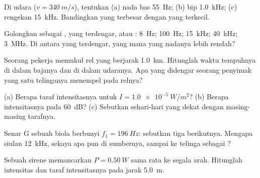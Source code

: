 \begin{exercise}[$\star$]\label{exo:g12:sound-acoustics:1}
Di udara ($v = \qty{340}{m/s}$), tentukan  (a) nada bas
\qty{55}{Hz}; (b)  bip \qty{1.0}{kHz}; (c) rengekan \qty{15}{kHz}.
Bandingkan yang terbesar dengan yang terkecil.
\end{exercise}

\begin{exercise}[$\star$]\label{exo:g12:sound-acoustics:2}
Golongkan sebagai ,  yang terdengar, atau :
\qty{8}{Hz}; \qty{100}{Hz}; \qty{15}{kHz}; \qty{40}{kHz}; \qty{3}{MHz}.
Di antara yang terdengar, yang mana yang nadanya lebih rendah?
\end{exercise}

\begin{exercise}[$\star$]\label{exo:g12:sound-acoustics:3}
Seorang pekerja memukul rel yang berjarak \qty{1.0}{km}. Hitunglah waktu
tempuhnya di dalam bajanya dan di dalam udaranya. Apa yang didengar
seorang penyimak yang satu telinganya menempel pada relnya?
\end{exercise}

\begin{exercise}[$\star$]\label{exo:g12:sound-acoustics:4}
(a) Berapa taraf intensitasnya untuk $I = \qty{1.0e-5}{W/m^2}$?
(b) Berapa intensitasnya pada \qty{60}{dB}? (c) Sebutkan 
sehari-hari yang dekat dengan masing-masing tarafnya.
\end{exercise}

\begin{exercise}[$\star$]\label{exo:g12:sound-acoustics:5}
Senar G sebuah biola berbunyi $f_1 = \qty{196}{Hz}$: sebutkan tiga
 berikutnya. Mengapa siulan \qty{12}{kHz}, sekaya apa pun di
sumbernya, sampai ke telinga sebagai ?
\end{exercise}

\begin{exercise}[$\star\star$]\label{exo:g12:sound-acoustics:6}
Sebuah sirene memancarkan $P = \qty{0.50}{W}$ sama rata ke segala arah.
Hitunglah intensitas dan taraf intensitasnya pada jarak \qty{5.0}{m}.
\end{exercise}

